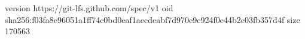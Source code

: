 version https://git-lfs.github.com/spec/v1
oid sha256:f03fa8e96051a1ff74c0bd0eaf1aecdeabf7d970e9c924f0e44b2c03fb357d4f
size 170563
